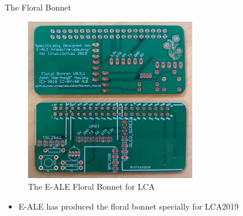 \begin{frame}
   {The Floral Bonnet}
   \begin{figure}[H]
      \includegraphics[height=2.8in]{IMAGES/floral-bonnet-bare.jpg}
      \caption{The E-ALE Floral Bonnet for LCA}
   \end{figure}
   \begin{itemize}
      \item E-ALE has produced the floral bonnet specially for LCA2019
   \end{itemize}
\end{frame}

\cprotect{}

